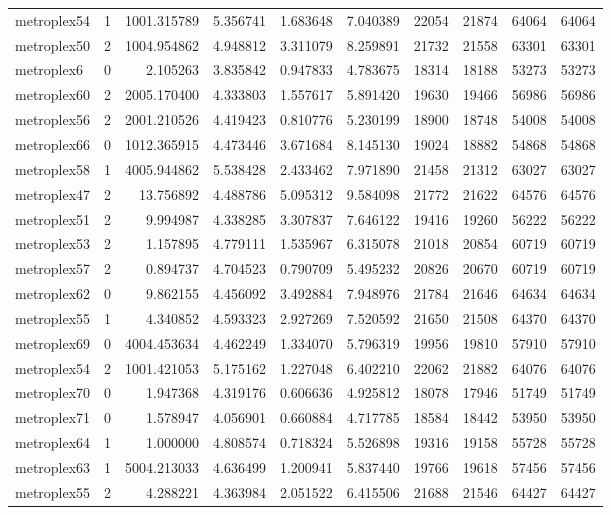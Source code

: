 \begin{longtable}{|l|r|r|r|r|r|r|r|r|r|}
metroplex54 & 1 & 1001.315789 & 5.356741 & 1.683648 & 7.040389 & 22054 & 21874 & 64064 & 64064 \\
metroplex50 & 2 & 1004.954862 & 4.948812 & 3.311079 & 8.259891 & 21732 & 21558 & 63301 & 63301 \\
metroplex6 & 0 & 2.105263 & 3.835842 & 0.947833 & 4.783675 & 18314 & 18188 & 53273 & 53273 \\
metroplex60 & 2 & 2005.170400 & 4.333803 & 1.557617 & 5.891420 & 19630 & 19466 & 56986 & 56986 \\
metroplex56 & 2 & 2001.210526 & 4.419423 & 0.810776 & 5.230199 & 18900 & 18748 & 54008 & 54008 \\
metroplex66 & 0 & 1012.365915 & 4.473446 & 3.671684 & 8.145130 & 19024 & 18882 & 54868 & 54868 \\
metroplex58 & 1 & 4005.944862 & 5.538428 & 2.433462 & 7.971890 & 21458 & 21312 & 63027 & 63027 \\
metroplex47 & 2 & 13.756892 & 4.488786 & 5.095312 & 9.584098 & 21772 & 21622 & 64576 & 64576 \\
metroplex51 & 2 & 9.994987 & 4.338285 & 3.307837 & 7.646122 & 19416 & 19260 & 56222 & 56222 \\
metroplex53 & 2 & 1.157895 & 4.779111 & 1.535967 & 6.315078 & 21018 & 20854 & 60719 & 60719 \\
metroplex57 & 2 & 0.894737 & 4.704523 & 0.790709 & 5.495232 & 20826 & 20670 & 60719 & 60719 \\
metroplex62 & 0 & 9.862155 & 4.456092 & 3.492884 & 7.948976 & 21784 & 21646 & 64634 & 64634 \\
metroplex55 & 1 & 4.340852 & 4.593323 & 2.927269 & 7.520592 & 21650 & 21508 & 64370 & 64370 \\
metroplex69 & 0 & 4004.453634 & 4.462249 & 1.334070 & 5.796319 & 19956 & 19810 & 57910 & 57910 \\
metroplex54 & 2 & 1001.421053 & 5.175162 & 1.227048 & 6.402210 & 22062 & 21882 & 64076 & 64076 \\
metroplex70 & 0 & 1.947368 & 4.319176 & 0.606636 & 4.925812 & 18078 & 17946 & 51749 & 51749 \\
metroplex71 & 0 & 1.578947 & 4.056901 & 0.660884 & 4.717785 & 18584 & 18442 & 53950 & 53950 \\
metroplex64 & 1 & 1.000000 & 4.808574 & 0.718324 & 5.526898 & 19316 & 19158 & 55728 & 55728 \\
metroplex63 & 1 & 5004.213033 & 4.636499 & 1.200941 & 5.837440 & 19766 & 19618 & 57456 & 57456 \\
metroplex55 & 2 & 4.288221 & 4.363984 & 2.051522 & 6.415506 & 21688 & 21546 & 64427 & 64427 \\

\end{longtable}
